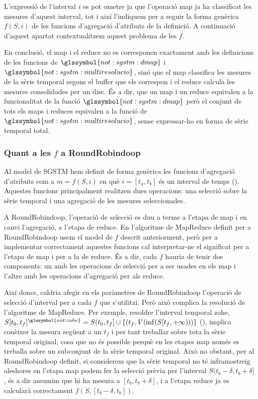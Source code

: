 L'expressió de l'interval $i$ es pot ometre ja que l'operació map ja
ha classificat les mesures d'aquest interval, tot i així l'indiquem
per a seguir la forma genèrica $f(S,i)$ de les funcions d'agregació
d'atributs de la definició. A continuació d'aquest apartat
contextualitzem aquest problema de les $f$.


En conclusió, el map i el reduce no es corresponen exactament
amb les definicions de les funcions de $\glssymbol{not:sgstm:dmap}$ i
$\glssymbol{not:sgstm:multiresolucio}$, sinó
que el map classifica les mesures de la sèrie temporal segons el
buffer que els correspon i el reduce calcula les mesures consolidades
per un disc. És a dir, que un map i un reduce equivalen a la
funcionalitat de la funció $\glssymbol{not:sgstm:dmap}$ però el
conjunt de tots els maps i reduces equivalen a la funció de
$\glssymbol{not:sgstm:multiresolucio}$, sense expressar-ho en forma de
sèrie temporal total.



\subsubsection{Quant a les $f$ a RoundRobindoop}
\label{sec:mapreduce:f}

Al model de \gls{SGSTM} hem definit de forma genèrica les funcions
d'agregació d'atributs com a $m=f(S,i)$ en què $i=[t_a,t_b]$ és un
interval de temps (). Aquestes funcions
principalment realitzen dues operacions: una selecció sobre la sèrie
temporal i una agregació de les mesures seleccionades.

A RoundRobindoop, l'operació de selecció es duu a terme a l'etapa de
map i en canvi l'agregació, a l'etapa de reduce.  En l'algoritme de
MapReduce definit per a RoundRobindoop usem el model de $f$ descrit
anteriorment, però per a implementar correctament aquestes funcions
cal interpretar-ne el significat per a l'etapa de map i per a la de
reduce. És a dir, cada $f$ hauria de tenir dos components: un amb les
operacions de selecció per a ser usades en els map i l'altre amb les
operacions d'agregació per als reduce.


Així doncs, caldria afegir en els paràmetres de RoundRobindoop
l'operació de selecció d'interval per a cada $f$ que s'utilitzi. Però
això complica la resolució de l'algoritme de MapReduce. Per exemple,
resoldre l'interval temporal \gls{zohe},
$S[t_0,t_f]^{\glssymbol{not:zohe}} = S(t_0,t_f] \cup \{
(t_f,V(\inf(S[t_f,+\infty))) \}$ (), implica
conèixer la mesura següent a un $t_f$ i per tant treballar sobre tota
la sèrie temporal original, cosa que no és possible perquè en les
etapes map només es treballa sobre un subconjunt de la sèrie temporal
original. Això no obstant, per al RoundRobindoop definit, si
considerem que la sèrie temporal no té inframostreig aleshores en
l'etapa map podem fer la selecció prèvia per l'interval
$S(t_b-\delta,t_b+\delta]$, és a dir assumim que hi ha mesura a
$[t_b,t_b+\delta]$, i a l'etapa reduce ja es calcularà correctament
$f(S,[t_b-\delta,t_b])$.


